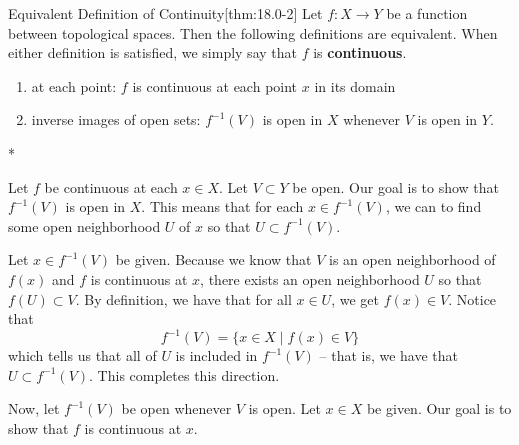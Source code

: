 \begin{thmBox}{Equivalent Definition of Continuity}[thm:18.0-2]
    Let \( f: X \rightarrow Y \) be a function between topological spaces. 
    Then the following definitions are equivalent.
    When either definition is satisfied, we simply say that \( f \) is 
    \textbf{continuous}.
    \begin{enumerate}[label = (\alph*)]
        \item at each point: \( f \) is continuous at each point \( x \) in its 
            domain
        \item inverse images of open sets: \( f^{ -1 } ( V ) \) is open in 
            \( X \) whenever \( V \) is open in \( Y \).
    \end{enumerate}

    \baseRule

    \begin{proofBox}*

        Let \( f \) be continuous at each \( x \in X \).
        Let \( V \subset Y \) be open.
        Our goal is to show that \( f^{ -1 } ( V ) \) is open in \( X \).
        This means that for each \( x \in f^{ -1 } ( V ) \), we can to find some open neighborhood \( U \) of \( x \) so that 
        \( U \subset f^{ -1 } ( V ) \).
        
        \baseSkip

        Let \( x \in f^{ -1 } ( V ) \) be given.
        Because we know that \( V \) is an open neighborhood of \( f ( x ) \) 
        and \( f \) is continuous at \( x \), there exists an open neighborhood 
        \( U \) so that \( f ( U ) \subset V \).
        By definition, we have that for all \( x \in U \), we get 
        \( f ( x ) \in V \).
        Notice that 
        \begin{equation*}
            f^{ -1 } ( V )
            =
            \{ x \in X \mid f ( x ) \in V \}
        \end{equation*}
        which tells us that all of \( U \) is included in \( f^{ -1 } ( V ) \)
        -- that is, we have that \( U \subset f^{ -1 } ( V ) \).
        This completes this direction.

        \baseSkip


        Now, let \( f^{ -1 } ( V ) \) be open whenever \( V \) is open.
        Let \( x \in X \) be given.
        Our goal is to show that \( f \) is continuous at \( x \).


\end{proofBox}
\end{thmBox}
